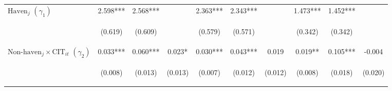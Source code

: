\begin{center}
\begin{tabular}{lccccccccc}
$\text{Haven}_j$ $(\gamma_1)$ & 2.598*** & 2.568*** &  & 2.363*** & 2.343*** &  & 1.473*** & 1.452*** &  \\
\vspace{4pt} & \begin{footnotesize}(0.619)\end{footnotesize} & \begin{footnotesize}(0.609)\end{footnotesize} & \begin{footnotesize}\end{footnotesize} & \begin{footnotesize}(0.579)\end{footnotesize} & \begin{footnotesize}(0.571)\end{footnotesize} & \begin{footnotesize}\end{footnotesize} & \begin{footnotesize}(0.342)\end{footnotesize} & \begin{footnotesize}(0.342)\end{footnotesize} & \begin{footnotesize}\end{footnotesize} \\
$\text{Non-haven}_j\times\text{CIT}_{it}$ $ (\gamma_2)$ & 0.033*** & 0.060*** & 0.023* & 0.030*** & 0.043*** & 0.019 & 0.019** & 0.105*** & -0.004 \\
\vspace{4pt} & \begin{footnotesize}(0.008)\end{footnotesize} & \begin{footnotesize}(0.013)\end{footnotesize} & \begin{footnotesize}(0.013)\end{footnotesize} & \begin{footnotesize}(0.007)\end{footnotesize} & \begin{footnotesize}(0.012)\end{footnotesize} & \begin{footnotesize}(0.012)\end{footnotesize} & \begin{footnotesize}(0.008)\end{footnotesize} & \begin{footnotesize}(0.018)\end{footnotesize} & \begin{footnotesize}(0.020)\end{footnotesize} \\

\end{tabular}
\end{center}
